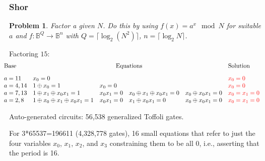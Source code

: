 \documentclass{beamer}
\newcommand{\red}[1]{{\color{red}{#1}}}
\newcommand{\Bool}{\ensuremath{\mathbb{B}}}
\newtheorem{prob}{Problem}
\begin{document}
\begin{frame}

  \frametitle{Shor}

\begin{prob}
  Factor a given $N$. Do this by using $f(x) = a^x \mod N$ for suitable $a$ and
  $f : \Bool^Q \rightarrow \Bool^n$ with $Q = \lceil \log_2 \left(N^2\right) \rceil$,
  $n = \lceil \log_2 N \rceil$.
\end{prob}

Factoring $15$:
\vspace*{-2mm}
{\tiny
\[\begin{array}{l@{\quad}lllll}
  \hspace*{-5mm}\textrm{Base} & \multicolumn{4}{c}{\textrm{Equations}} & \textrm{Solution} \\[2ex]
  \hspace*{-5mm} a=11 & x_0 = 0 &&&& \red{x_0 = 0} \\
  \hspace*{-5mm} a=4,14 & 1 \oplus x_0 = 1 & x_0 = 0 && & \red{x_0 = 0} \\
  \hspace*{-5mm} a=7,13 & 1 \oplus x_1 \oplus x_0x_1 = 1 & x_0x_1 = 0 & x_0 \oplus x_1 \oplus x_0x_1 = 0 &  x_0 \oplus x_0x_1 = 0 & \red{x_0=x_1=0} \\
  \hspace*{-5mm} a=2,8 & 1 \oplus x_0 \oplus x_1 \oplus x_0x_1 = 1 & x_0x_1 = 0 & x_1 \oplus x_0x_1 = 0 & x_0 \oplus x_0x_1 = 0  & \red{x_0=x_1=0}
\end{array}\]
}

  Auto-generated circuits: 56,538 generalized Toffoli gates. 

  \pause
  \vspace*{4mm}
  For 3*65537=196611 (4,328,778 gates),
   16 small equations that refer to just the four variables $x_0$, $x_1$, $x_2$, and $x_3$
constraining them to be all 0, i.e.,
asserting that the period is 16.
\end{frame}
\end{document}
